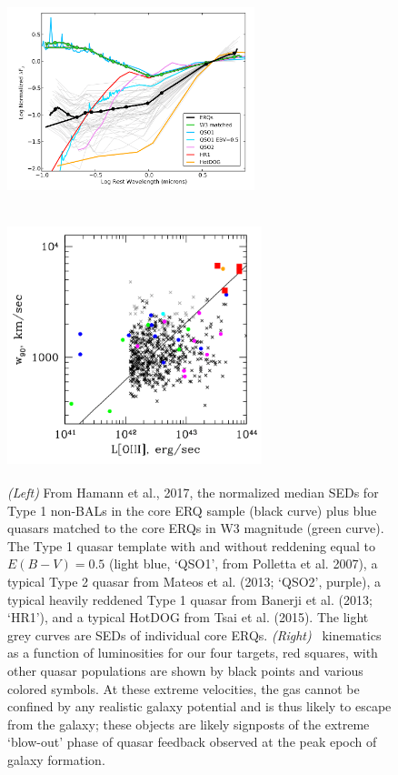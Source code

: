\setcounter{figure}{1}
\hspace{-2.5cm}
\begin{figure}[h]
  \begin{center}
    \hspace{-0.5cm}
    \includegraphics[height=7.0cm,width=7.2cm,  trim={42pt 0pt 22pt 12pt},clip]{../Figures/Hamann2017_Fig16_SEDs.png}
    \includegraphics[height=7.1cm,width=7.4cm, trim={12pt 22pt 42pt 12pt},clip]{../Figures/Zakamska_2016_Fig9.png}
    \vspace{-10pt}
    \caption{
      \scriptsize
      {\it (Left)} From Hamann et al., 2017, the normalized median
      SEDs for Type 1 non-BALs in the core ERQ sample (black curve) plus
      blue quasars matched to the core ERQs in W3 magnitude (green curve).
      The Type 1 quasar template with and without reddening equal to $E(B-V)
      = 0.5$ (light blue, `QSO1', from Polletta et al. 2007), a typical Type
      2 quasar from Mateos et al. (2013; `QSO2', purple), a typical heavily
      reddened Type 1 quasar from Banerji et al. (2013; `HR1'), and a
      typical HotDOG from Tsai et al. (2015). The light grey curves are SEDs
      of individual core ERQs.
      {\it (Right)} \oiii\ kinematics as a function of luminosities
      for our four targets, red squares, with other quasar populations are
      shown by black points and various colored symbols.  At these extreme
      velocities, the gas cannot be confined by any realistic galaxy
      potential and is thus likely to escape from the galaxy; these objects
      are likely signposts of the extreme `blow-out' phase of quasar
      feedback observed at the peak epoch of galaxy formation.
    }
    \vspace{-14pt}
    \label{fig:ERQ_SED}
  \end{center}
\end{figure}
